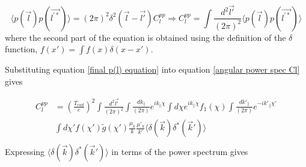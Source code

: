 \documentclass[12pt]{article}
\begin{document}
\begin{equation}\label{angular power spec Cl}
\langle p(\vec{l})p(\vec{l^{'*}})\rangle =(2\pi)^2 \delta^2(\vec{l}-\vec{l'})C_l^{pp} \Rightarrow C_l^{pp}=\int \frac{d^2\vec{l'}}{(2\pi)^2}\langle p(\vec{l})p(\vec{l^{'*}})\rangle 
\end{equation}
where the second part of the equation is obtained using the definition of the $\delta$ function, $f(x')=\int f(x)\delta(x-x')$.

Substituting equation \ref{final p(l) equation} into equation \ref{angular power spec Cl} gives 

\begin{equation}\label{Cl with delta}
\begin{aligned}
C_l^{pp}& =\left(\frac{T_{rad} }{c}\right)^2\int \frac{d^2\vec{l'}}{(2\pi)^2}\int \frac{dk_\parallel}{(2\pi)}e^{ik_\parallel \chi } \int  d\chi e^{ik_{\parallel}\chi}f_1(\chi) \int \frac{dk'_\parallel}{(2\pi)}e^{-ik'_\parallel \chi' }\\&
\int d\chi' f(\chi')\widetilde{g}(\chi' )\frac{\mu_k}{k}  \frac{\mu'_k}{k'}\langle  \delta(\vec{k})\delta^*(\vec{k}') \rangle\\
\end{aligned}
\end{equation}
Expressing $\langle  \delta(\vec{k})\delta^*(\vec{k}') \rangle$ in terms of the power spectrum gives
\end{document}
